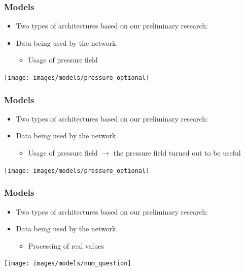 \documentclass[18pt]{beamer}
\begin{document}
\begin{frame}[t]
  \frametitle{Models}
  \begin{itemize}
  \item Two types of architectures based on our preliminary research:
  \item Data being used by the network.
    \begin{itemize}
    \item Usage of pressure field
    \end{itemize}
  \end{itemize}

  \vspace{0.5cm}
  \begin{center}
    \texttt{[image: images/models/pressure\_optional]}
  \end{center}  
\end{frame}


\begin{frame}[t]
  \frametitle{Models}
  \begin{itemize}
  \item Two types of architectures based on our preliminary research:
  \item Data being used by the network.
    \begin{itemize}
      \item Usage of pressure field $\rightarrow$ the pressure field turned out to be useful
    \end{itemize}
  \end{itemize}

  \vspace{0.5cm}
  \begin{center}
    \texttt{[image: images/models/pressure\_optional]}
  \end{center}  
\end{frame}

\begin{frame}[t]
  \frametitle{Models}
  \begin{itemize}
  \item Two types of architectures based on our preliminary research:
  \item Data being used by the network.
    \begin{itemize}
    \item Processing of real values
    \end{itemize}
  \end{itemize}

  \vspace{0.5cm}
    \begin{center}
    \texttt{[image: images/models/num\_question]}
  \end{center}
\end{frame}
\end{document}
